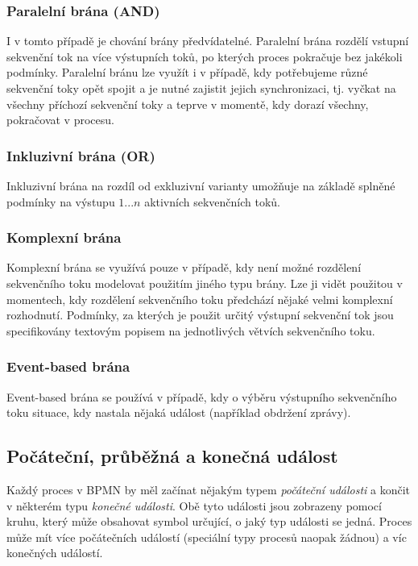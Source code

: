 \subsubsection{Paralelní brána (AND)}
I v tomto případě je chování brány předvídatelné. Paralelní brána rozdělí vstupní sekvenční tok na více výstupních toků, po kterých proces pokračuje bez jakékoli podmínky. Paralelní bránu lze využít i v případě, kdy potřebujeme různé sekvenční toky opět spojit a je nutné zajistit jejich synchronizaci, tj. vyčkat na všechny příchozí sekvenční toky a teprve v momentě, kdy dorazí všechny, pokračovat v procesu.

\subsubsection{Inkluzivní brána (OR)}
Inkluzivní brána na rozdíl od exkluzivní varianty umožňuje na základě splněné podmínky na výstupu $1...n$ aktivních sekvenčních toků.

\subsubsection{Komplexní brána}
Komplexní brána se využívá pouze v případě, kdy není možné rozdělení sekvenčního toku modelovat použitím jiného typu brány. Lze ji vidět použitou v momentech, kdy rozdělení sekvenčního toku předchází nějaké velmi komplexní rozhodnutí. Podmínky, za kterých je použit určitý výstupní sekvenční tok jsou specifikovány textovým popisem na jednotlivých větvích sekvenčního toku.

\subsubsection{Event-based brána}
Event-based brána se používá v případě, kdy o výběru výstupního sekvenčního toku  situace, kdy nastala nějaká událost (například obdržení zprávy).

\subsection{Počáteční, průběžná a konečná událost}
Každý proces v BPMN by měl začínat nějakým typem \textit{počáteční události} a končit v některém typu \textit{konečné události}. Obě tyto události jsou zobrazeny pomocí kruhu, který může obsahovat symbol určující, o jaký typ události se jedná. Proces může mít více počátečních událostí (speciální typy procesů naopak žádnou) a víc konečných událostí.

